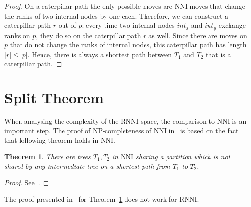 \documentclass[11pt, a4paper]{article}
\newcommand{\nni}{\mathrm{NNI}}
\newcommand{\rnni}{\mathrm{RNNI}}
\newtheorem{theorem}[definition]{Theorem}
\begin{document}
\begin{proof}
	On a caterpillar path the only possible moves are $\nni$ moves that change the ranks of two internal nodes by one each.
	Therefore, we can construct a caterpillar path $r$ out of $p$:
	every time two internal nodes $int_x$ and $int_y$ exchange ranks on $p$, they do so on the caterpillar path $r$ as well.
	Since there are moves on $p$ that do not change the ranks of internal nodes, this caterpillar path has length $|r| \leq |p|$.
	Hence, there is always a shortest path between $T_1$ and $T_2$ that is a caterpillar path.
\end{proof}

\section{Split Theorem}

When analysing the complexity of the $\rnni$ space, the comparison to $\nni$ is an important step.
The proof of NP-completeness of $\nni$ in~\cite{jiang2000} is based on the fact that following theorem holds in $\nni$.

\begin{theorem}
	There are trees $T_1,T_2$ in $\nni$ sharing a partition which is not shared by any intermediate tree on a shortest path from $T_1$ to $T_2$.
	\label{thm:split_nni}
\end{theorem}

\begin{proof}
	See~\cite{Li1996}.
\end{proof}

The proof presented in~\cite{Li1996} for Theorem~\ref{thm:split_nni} does not work for $\rnni$.
\end{document}
